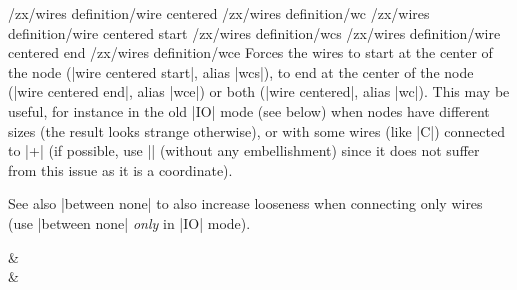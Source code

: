 \documentclass[a4paper,doc2]{ltxdoc} %
\begin{document}
{\begin{pgfmanualentry}
  \makeatletter
  \def\extrakeytext{style, }
  \extractkey/zx/wires definition/wire centered\@nil%
  \extractkey/zx/wires definition/wc\@nil%
  \extractkey/zx/wires definition/wire centered start\@nil%
  \extractkey/zx/wires definition/wcs\@nil%
  \extractkey/zx/wires definition/wire centered end\@nil%
  \extractkey/zx/wires definition/wce\@nil%
  \makeatother
  \pgfmanualbody
  Forces the wires to start at the center of the node (|wire centered start|, alias |wcs|), to end at the center of the node (|wire centered end|, alias |wce|) or both (|wire centered|, alias |wc|). This may be useful, for instance in the old |IO| mode (see below) when nodes have different sizes (the result looks strange otherwise), or with some wires (like |C|) connected to |\ZxNone+| (if possible, use |\zxNone| (without any embellishment) since it does not suffer from this issue as it is a coordinate).

  See also |between none| to also increase looseness when connecting only wires (use |between none| \emph{only} in |IO| mode).
\begin{codeexample}[width=3cm]
\begin{ZX}
  \zxZ{} \ar[IO,o',r] \ar[IO,o.,r]       & \zxX{\alpha}\\
  \zxZ{} \ar[IO,o',r,wc] \ar[IO,o.,r,wc] & \zxX{\alpha}
\end{ZX}
\end{codeexample}
\end{pgfmanualentry}


}
\end{document}
